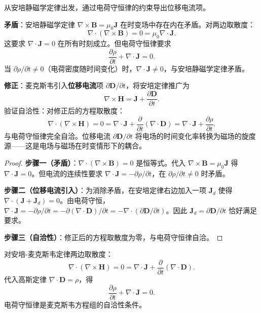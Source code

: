 \begin{theorem}[安培-麦克斯韦定律的导出与位移电流]\label{thm:ampere_maxwell_derivation}
从安培静磁学定律出发，通过电荷守恒律的约束导出位移电流项。

\textbf{矛盾}：安培静磁学定律 $\nabla \times \mathbf{B} = \mu_0 \mathbf{J}$ 在时变场中存在内在矛盾。对两边取散度：
\[
\nabla \cdot (\nabla \times \mathbf{B}) = 0 = \mu_0 \nabla \cdot \mathbf{J}.
\]
这要求 $\nabla \cdot \mathbf{J} = 0$ 在所有时刻成立。但电荷守恒律要求
\[
\frac{\partial \rho}{\partial t} + \nabla \cdot \mathbf{J} = 0.
\]
当 $\partial\rho/\partial t \neq 0$（电荷密度随时间变化）时，$\nabla \cdot \mathbf{J} \neq 0$，与安培静磁学定律矛盾。

\textbf{修正}：麦克斯韦引入\textbf{位移电流}项 $\partial\mathbf{D}/\partial t$，将安培定律推广为
\[
\boxed{\nabla \times \mathbf{H} = \mathbf{J} + \frac{\partial \mathbf{D}}{\partial t}}.
\]
验证自洽性：对修正后的方程取散度：
\[
\nabla \cdot (\nabla \times \mathbf{H}) = 0 = \nabla \cdot \mathbf{J} + \frac{\partial}{\partial t}(\nabla \cdot \mathbf{D}) = \nabla \cdot \mathbf{J} + \frac{\partial\rho}{\partial t}.
\]
与电荷守恒律完全自洽。位移电流 $\partial\mathbf{D}/\partial t$ 将电场的时间变化率转换为磁场的旋度源——这是电场与磁场在时变情形下的耦合。
\end{theorem}

\begin{proof}
\textbf{步骤一（矛盾）}：$\nabla \cdot (\nabla \times \mathbf{B}) = 0$ 是恒等式。代入 $\nabla \times \mathbf{B} = \mu_0 \mathbf{J}$ 得 $\nabla \cdot \mathbf{J} = 0$。但电流的连续性要求 $\nabla \cdot \mathbf{J} = -\partial\rho/\partial t$，在 $\partial\rho/\partial t \neq 0$ 时矛盾。

\textbf{步骤二（位移电流引入）}：为消除矛盾，在安培定律右边加入一项 $\mathbf{J}_d$ 使得 $\nabla \cdot (\mathbf{J} + \mathbf{J}_d) = 0$。由电荷守恒，$\nabla \cdot \mathbf{J} = -\partial\rho/\partial t = -\partial(\nabla\cdot\mathbf{D})/\partial t = -\nabla \cdot (\partial\mathbf{D}/\partial t)$。因此 $\mathbf{J}_d = \partial\mathbf{D}/\partial t$ 恰好满足要求。

\textbf{步骤三（自洽性）}：修正后的方程取散度为零，与电荷守恒律自洽。
\end{proof}

\begin{corollary}[电荷守恒律的自动满足]\label{cor:charge_conservation}
对安培-麦克斯韦定律两边取散度：
\[
\nabla \cdot (\nabla \times \mathbf{H}) = 0 = \nabla \cdot \mathbf{J} + \frac{\partial}{\partial t}(\nabla \cdot \mathbf{D}).
\]
代入高斯定律 $\nabla \cdot \mathbf{D} = \rho$，得
\[
\boxed{\frac{\partial \rho}{\partial t} + \nabla \cdot \mathbf{J} = 0}.
\]
电荷守恒律是麦克斯韦方程组的自洽性条件。
\end{corollary}

